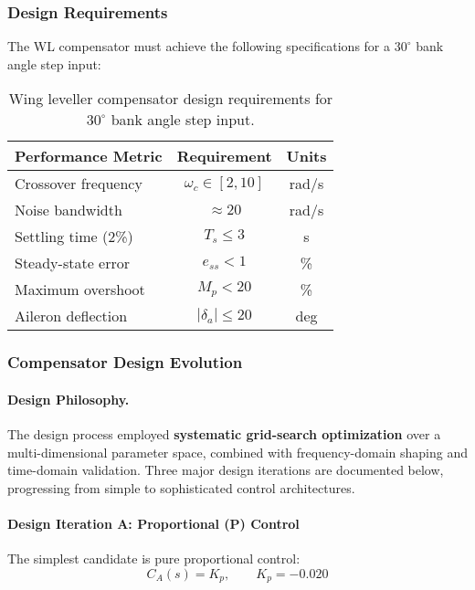 \subsubsection{Design Requirements}

The WL compensator must achieve the following specifications for a $30^\circ$ bank angle step input:

\begin{table}[h!]
\centering
\begin{tabular}{lcc}
\toprule
\textbf{Performance Metric} & \textbf{Requirement} & \textbf{Units} \\
\midrule
Crossover frequency & $\omega_c \in [2, 10]$ & rad/s \\
Noise bandwidth & $\approx 20$ & rad/s \\
Settling time (2\%) & $T_s \le 3$ & s \\
Steady-state error & $e_{ss} < 1$ & \% \\
Maximum overshoot & $M_p < 20$ & \% \\
Aileron deflection & $|\delta_a| \le 20$ & deg \\
\bottomrule
\end{tabular}
\caption{Wing leveller compensator design requirements for $30^\circ$ bank angle step input.}
\label{tab:wl_requirements}
\end{table}

\subsubsection{Compensator Design Evolution}

\paragraph{Design Philosophy.}
The design process employed \textbf{systematic grid-search optimization} over a multi-dimensional parameter space, combined with frequency-domain shaping and time-domain validation. Three major design iterations are documented below, progressing from simple to sophisticated control architectures.

\paragraph{Design Iteration A: Proportional (P) Control}

The simplest candidate is pure proportional control:
\begin{equation}
C_A(s) = K_p, \qquad K_p = -0.020
\label{eq:design_A}
\end{equation}


